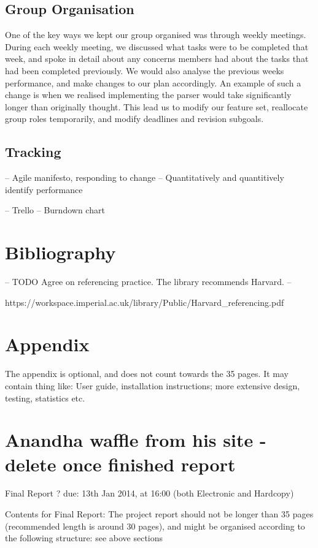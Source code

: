 \documentclass[a4wide, 11pt]{article} \usepackage{a4, fullpage}
\begin{document}
\subsection{Group Organisation}

One of the key ways we kept our group organised was through weekly meetings.
During each weekly meeting, we discussed what tasks were to be completed that
week, and spoke in detail about any concerns members had about the tasks that
had been completed previously. We would also analyse the previous weeks
performance, and make changes to our plan accordingly. An example of such a
change is when we realised implementing the parser would take significantly
longer than originally thought. This lead us to modify our feature set,
reallocate group roles temporarily, and modify deadlines and revision subgoals.


\subsection{Tracking}

-- Agile manifesto, responding to change
-- Quantitatively and quantitively identify performance

-- Trello
-- Burndown chart

\section{Bibliography}

-- TODO Agree on referencing practice. The library recommends Harvard. --

https://workspace.imperial.ac.uk/library/Public/Harvard\_referencing.pdf

\section{Appendix}

The appendix is optional, and does not count towards the 35 pages. It may contain thing like: User guide, installation instructions; more extensive design, testing, statistics etc.

\section{Anandha waffle from his site - delete once finished report}

Final Report ? due: 13th Jan 2014, at 16:00 (both Electronic and Hardcopy)

Contents for Final Report: The project report should not be longer than 35 pages (recommended length is around 30 pages), and might be organised according to the following structure: see above sections
\end{document}
